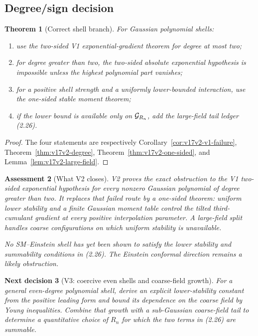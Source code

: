 \documentclass[11pt]{article}
\newtheorem{theorem}{Theorem}[section]
\newtheorem{decision}[theorem]{Next decision}
\newtheorem{assessment}[theorem]{Assessment}
\theoremstyle{remark}
\begin{document}
\subsection{Degree/sign decision}

\begin{theorem}[Correct shell branch]
\label{thm:v17v2-branch}
For Gaussian polynomial shells:
\begin{enumerate}
\item use the two-sided V1 exponential-gradient theorem for degree at
      most two;
\item for degree greater than two, the two-sided absolute exponential
      hypothesis is impossible unless the highest polynomial part
      vanishes;
\item for a positive shell strength and a uniformly lower-bounded
      interaction, use the one-sided stable moment theorem;
\item if the lower bound is available only on
      \({\cal G}_{R_n}\), add the large-field tail ledger (2.26).
\end{enumerate}
\end{theorem}

\begin{proof}
The four statements are respectively
Corollary~\ref{cor:v17v2-v1-failure},
Theorem~\ref{thm:v17v2-degree},
Theorem~\ref{thm:v17v2-one-sided}, and
Lemma~\ref{lem:v17v2-large-field}.
\end{proof}

\begin{assessment}[What V2 closes]
\label{ass:v17v2-status}
V2 proves the exact obstruction to the V1 two-sided exponential
hypothesis for every nonzero Gaussian polynomial of degree greater
than two.  It replaces that failed route by a one-sided theorem:
uniform lower stability and a finite Gaussian moment table control
the tilted third-cumulant gradient at every positive interpolation
parameter.  A large-field split handles coarse configurations on
which uniform stability is unavailable.

No SM--Einstein shell has yet been shown to satisfy the lower
stability and summability conditions in (2.26).  The Einstein
conformal direction remains a likely obstruction.
\end{assessment}

\begin{decision}[V3: coercive even shells and coarse-field growth]
\label{dec:v17v2-next}
For a general even-degree polynomial shell, derive an explicit
lower-stability constant from the positive leading form and bound
its dependence on the coarse field by Young inequalities.  Combine
that growth with a sub-Gaussian coarse-field tail to determine a
quantitative choice of \(R_n\) for which the two terms in (2.26) are
summable.
\end{decision}
\end{document}
